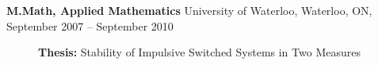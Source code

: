 \documentclass[10pt]{article}
\begin{document}
\begin{description}

    \item[]\textbf{M.Math, Applied Mathematics}\newline%
      University of Waterloo, Waterloo, ON, September 2007 -- September 2010
      \begin{description}
        \item[]\textbf{Thesis:} Stability of Impulsive Switched Systems in Two Measures


\end{description}
\end{description}
\end{document}
